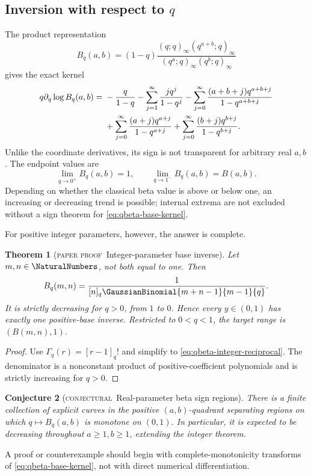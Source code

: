 \documentclass[11pt,oneside]{article}
\newtheorem{theorem}{Theorem}[section]
\newtheorem{conjecture}[theorem]{Conjecture}
\theoremstyle{definition}
\theoremstyle{remark}
\theoremstyle{plain}
\theoremstyle{definition}
\theoremstyle{remark}
\newcommand{\statusproved}{\textcolor{provedgreen}{\textsc{paper proof}}}
\newcommand{\statusconjectural}{\textcolor{conjectureorange}{\textsc{conjectural}}}
\numberwithin{equation}{section}
\numberwithin{figure}{section}
\numberwithin{table}{section}
\let\reportsubsection\subsection
\let\reportsubsubsection\subsubsection
\let\section\reportsubsection
\let\subsection\reportsubsubsection
\begin{document}
\section{Inversion with respect to \texorpdfstring{\(q\)}{q}}
The product representation
\[
 B_q(a,b)=(1-q)
 \frac{(q;q)_\infty(q^{a+b};q)_\infty}
 {(q^a;q)_\infty(q^b;q)_\infty}
\]
gives the exact kernel
\begin{align}
 q\partial_q\log B_q(a,b)
={}&-\frac{q}{1-q}
 -\sum_{j=1}^\infty\frac{jq^j}{1-q^j}
 -\sum_{j=0}^\infty\frac{(a+b+j)q^{a+b+j}}{1-q^{a+b+j}}\notag\\
&+\sum_{j=0}^\infty\frac{(a+j)q^{a+j}}{1-q^{a+j}}
 +\sum_{j=0}^\infty\frac{(b+j)q^{b+j}}{1-q^{b+j}}.
 \label{eq:qbeta-base-kernel}
\end{align}
Unlike the coordinate derivatives, its sign is not transparent for arbitrary
real \(a,b\).  The endpoint values are
\[
 \lim_{q\to0^+}B_q(a,b)=1,
 \qquad
 \lim_{q\to1^-}B_q(a,b)=B(a,b).
\]
Depending on whether the classical beta value is above or below one, an
increasing or decreasing trend is possible; internal extrema are not excluded
without a sign theorem for \eqref{eq:qbeta-base-kernel}.

For positive integer parameters, however, the answer is complete.

\begin{theorem}[\statusproved\ Integer-parameter base inverse]
Let \(m,n\in\NaturalNumbers\), not both equal to one.  Then
\begin{equation}
 B_q(m,n)=
 \frac1{[n]_q\GaussianBinomial{m+n-1}{m-1}{q}}.
 \label{eq:qbeta-integer-reciprocal}
\end{equation}
It is strictly decreasing for \(q>0\), from \(1\) to \(0\).  Hence every
\(y\in(0,1)\) has exactly one positive-base inverse.  Restricted to
\(0<q<1\), the target range is \((B(m,n),1)\).
\end{theorem}
\begin{proof}
Use \(\Gamma_q(r)=[r-1]_q!\) and simplify to
\eqref{eq:qbeta-integer-reciprocal}.  The denominator is a nonconstant product
of positive-coefficient polynomials and is strictly increasing for \(q>0\).
\end{proof}

\begin{conjecture}[\statusconjectural\ Real-parameter beta sign regions]
There is a finite collection of explicit curves in the positive
\((a,b)\)-quadrant separating regions on which
\(q\mapsto B_q(a,b)\) is monotone on \((0,1)\).  In particular, it is expected
to be decreasing throughout \(a\ge1,b\ge1\), extending the integer theorem.
\end{conjecture}
A proof or counterexample should begin with complete-monotonicity transforms of
\eqref{eq:qbeta-base-kernel}, not with direct numerical differentiation.
\end{document}
